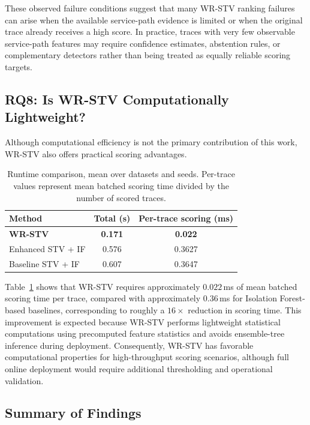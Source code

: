 \documentclass[informatics,article,submit,moreauthors]{Definitions/mdpi}
\newcommand{\rev}[1]{{\color{revisionblue}#1}}
\begin{document}
\rev{These observed failure conditions suggest that many WR-STV ranking failures can arise when the available service-path evidence is limited or when the original trace already receives a high score.} In practice, traces with very few observable service-path features may require confidence estimates, abstention rules, or complementary detectors rather than being treated as equally reliable scoring targets.

\subsection{RQ8: Is WR-STV Computationally Lightweight?}

Although computational efficiency is not the primary contribution of
this work, WR-STV also offers practical scoring advantages.
\begin{table}[t]
	\centering
	\caption{\rev{Runtime comparison, mean over datasets and seeds. Per-trace values represent mean batched scoring time divided by the number of scored traces.}}
	\label{tab:runtime}
	\begin{tabular}{lcc}
		\toprule
		\textbf{Method} & \textbf{Total (s)} & \textbf{Per-trace scoring (ms)} \\
		\midrule
		\textbf{WR-STV}    & \textbf{0.171} & \textbf{0.022} \\
		Enhanced STV + IF  & 0.576 & 0.3627 \\
		Baseline STV + IF  & 0.607 & 0.3647 \\
		\bottomrule
	\end{tabular}
\end{table}
Table~\ref{tab:runtime} shows that WR-STV requires approximately
\(0.022\)\,ms of mean batched scoring time per trace, compared with
approximately \(0.36\)\,ms for
Isolation Forest-based baselines, corresponding to roughly a
\(16\times\) reduction in scoring time. This improvement is expected
because WR-STV performs lightweight statistical computations using
precomputed feature statistics and avoids ensemble-tree inference during
deployment. Consequently, WR-STV has favorable computational properties
for high-throughput scoring scenarios, although full online deployment
would require additional thresholding and operational validation.

\subsection{Summary of Findings}
\end{document}
